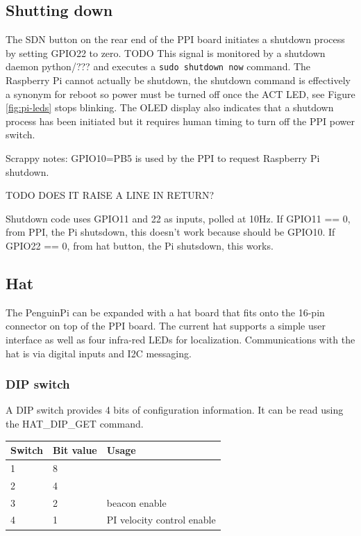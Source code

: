 \documentclass[11pt,fleqn]{article}
\begin{document}
\subsection{Shutting down}
The SDN button on the rear end of the PPI board initiates a shutdown process by setting GPIO22 to zero.
TODO This signal  is monitored by a shutdown daemon python/??? and executes a \texttt{sudo shutdown now} command.
The Raspberry Pi cannot actually be shutdown, the 
shutdown command is effectively a synonym for reboot so power must be turned off once the ACT LED, see
Figure \ref{fig:pi-leds} stops blinking.  The OLED
display also indicates that a shutdown process has been initiated but it requires human timing to turn off the PPI power switch.

Scrappy notes: GPIO10=PB5 is used by the PPI to request Raspberry Pi shutdown.

TODO DOES IT RAISE A LINE IN RETURN?

Shutdown code uses GPIO11 and 22 as inputs, polled at 10Hz.  If GPIO11 == 0, from PPI, the Pi shutsdown, this doesn't work because should be GPIO10.
If GPIO22 == 0, from hat button, the Pi shutsdown, this works.


\subsection{Hat}
The PenguinPi can be expanded with a hat board that fits onto the 16-pin connector on top of the PPI board.
The current hat supports a simple user interface as well as four infra-red LEDs for
localization.  Communications with the hat is via digital inputs and I2C messaging.

\subsubsection{DIP switch}
A DIP switch provides 4 bits of configuration information.  
It can be read using the HAT\_DIP\_GET command. 

\begin{center}
\begin{tabular}{|l|l|l|}\hline
Switch & Bit value & Usage \\ \hline\hline
1 & 8 & \\
2 & 4 & \\
3 & 2 & beacon enable \\
4 & 1 & PI velocity control enable \\\hline
\end{tabular}
\end{center}
\end{document}
